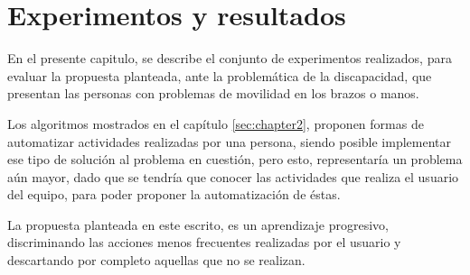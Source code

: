 \chapter{Experimentos y resultados}
\label{sec:chapter5}

En el presente capitulo, se describe el conjunto de experimentos realizados,
 para evaluar la propuesta planteada, ante la problem\'atica de la discapacidad, 
 que presentan las personas con problemas de movilidad en los brazos o manos.



Los algoritmos mostrados en el cap\'itulo \ref{sec:chapter2}, proponen formas
 de automatizar actividades realizadas por una persona, siendo posible 
 implementar ese tipo de soluci\'on al problema en cuesti\'on, pero esto, 
 representar\'ia un problema a\'un mayor, dado que se tendr\'ia que conocer 
 las actividades que realiza el usuario del equipo, para poder proponer la 
 automatizaci\'on de \'estas. 


La propuesta planteada en este escrito, es un aprendizaje progresivo,
 discriminando las acciones menos frecuentes realizadas por el usuario y 
 descartando por completo aquellas que no se realizan.






